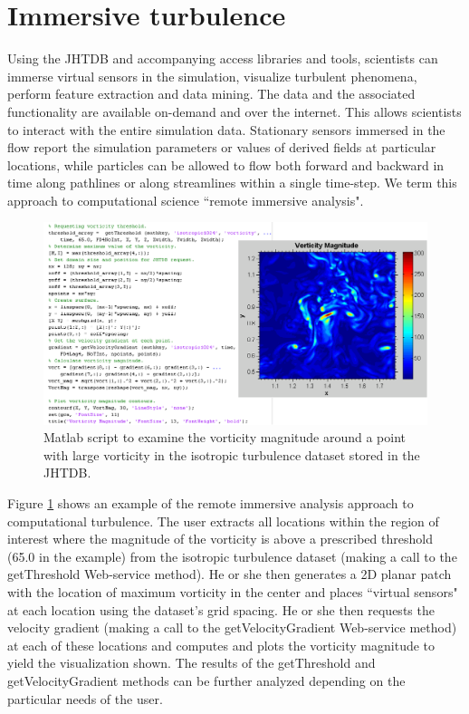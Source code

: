 \documentclass[10pt,twocolumn]{article}
\begin{document}
\section{Immersive turbulence}
Using the JHTDB and accompanying access libraries and tools, scientists can immerse virtual sensors in the simulation, visualize turbulent phenomena, 
perform feature extraction and data mining. The data and the associated functionality are available on-demand and over the internet. This allows scientists 
to interact with the entire simulation data. Stationary sensors immersed in the flow report the simulation parameters or values of derived fields at particular 
locations, while particles can be allowed to flow both forward and backward in time along pathlines or along streamlines within a single time-step. 
We term this approach to computational science ``remote immersive analysis".

\begin{figure}
\includegraphics[width=1.0\textwidth]{vorticity.png}
\caption{Matlab script to examine the vorticity magnitude around a point with large vorticity in the isotropic turbulence dataset stored in the JHTDB.}
\label{fig:vorticity}
\end{figure}

Figure \ref{fig:vorticity} shows an example of the remote immersive analysis approach to computational turbulence. The user extracts all locations within the
region of interest where the magnitude of the vorticity is above a prescribed threshold (65.0 in the example) from the isotropic turbulence dataset (making 
a call to the getThreshold Web-service method). He or she then generates a 2D planar patch with the location of maximum vorticity in the center and places
``virtual sensors" at each location using the dataset's grid spacing. He or she then requests the velocity gradient (making a call to the getVelocityGradient
Web-service method) at each of these locations and computes and plots the vorticity magnitude to yield the visualization shown. The results of the 
getThreshold and getVelocityGradient methods can be further analyzed depending on the particular needs of the user.
\end{document}
